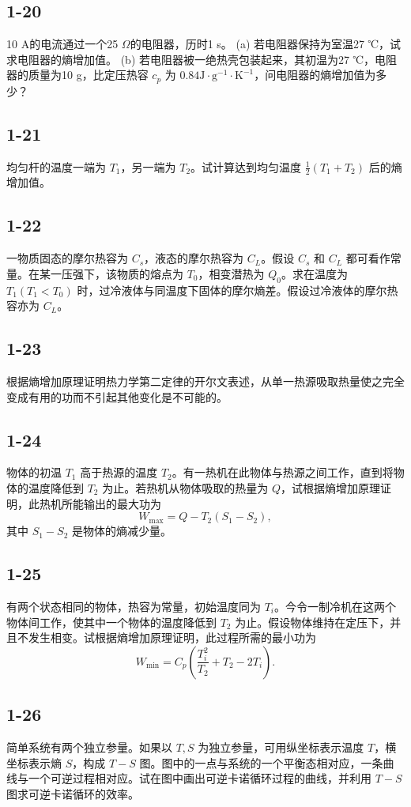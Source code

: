 \newpage
\subsection{1-20}
10 A的电流通过一个25 $\Omega$的电阻器，历时1 s。
(a) 若电阻器保持为室温27 ℃，试求电阻器的熵增加值。
(b) 若电阻器被一绝热壳包装起来，其初温为27 ℃，电阻器的质量为10 g，比定压热容 $c_p$ 为 $0.84 \mathrm{J \cdot g^{-1} \cdot K^{-1}}$，问电阻器的熵增加值为多少？

\newpage
\subsection{1-21}
均匀杆的温度一端为 $T_1$，另一端为 $T_2$。试计算达到均匀温度 $\frac{1}{2}(T_1 + T_2)$ 后的熵增加值。

\newpage
\subsection{1-22}
一物质固态的摩尔热容为 $C_s$，液态的摩尔热容为 $C_L$。假设 $C_s$ 和 $C_L$ 都可看作常量。在某一压强下，该物质的熔点为 $T_0$，相变潜热为 $Q_0$。求在温度为 $T_1 (T_1 < T_0)$ 时，过冷液体与同温度下固体的摩尔熵差。假设过冷液体的摩尔热容亦为 $C_L$。

\newpage
\subsection{1-23}
根据熵增加原理证明热力学第二定律的开尔文表述，从单一热源吸取热量使之完全变成有用的功而不引起其他变化是不可能的。

\newpage
\subsection{1-24}
物体的初温 $T_1$ 高于热源的温度 $T_2$。有一热机在此物体与热源之间工作，直到将物体的温度降低到 $T_2$ 为止。若热机从物体吸取的热量为 $Q$，试根据熵增加原理证明，此热机所能输出的最大功为
$$W_{\text{max}} = Q - T_2 (S_1 - S_2),$$
其中 $S_1 - S_2$ 是物体的熵减少量。

\newpage
\subsection{1-25}
有两个状态相同的物体，热容为常量，初始温度同为 $T_i$。今令一制冷机在这两个物体间工作，使其中一个物体的温度降低到 $T_2$ 为止。假设物体维持在定压下，并且不发生相变。试根据熵增加原理证明，此过程所需的最小功为
$$W_{\text{min}} = C_p \left( \frac{T_i^2}{T_2} + T_2 - 2T_i \right).$$

\newpage
\subsection{1-26}
简单系统有两个独立参量。如果以 $T, S$ 为独立参量，可用纵坐标表示温度 $T$，横坐标表示熵 $S$，构成 $T-S$ 图。图中的一点与系统的一个平衡态相对应，一条曲线与一个可逆过程相对应。试在图中画出可逆卡诺循环过程的曲线，并利用 $T-S$ 图求可逆卡诺循环的效率。
